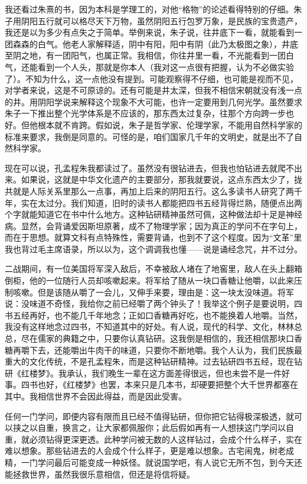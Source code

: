 我还看过朱熹的书，因为本科是学理工的，对他“格物”的论述看得特别的仔细。朱子用阴阳五行就可以格尽天下万物，虽然阴阳五行包罗万象，是民族的宝贵遗产，我还是以为多少有点失之于简单。举例来说，朱子说，往井底下一看，就能看到一团森森的白气。他老人家解释适，阴中有阳，阳中有阴（此乃太极图之象），井底至阴之地，有一团阳气，也属正常。我相信，你往井里一看，不光能看到一团白气，还能看到一个人头，那就是你本人（我对这一点很有把握，认为不必做实验了）。不知为什么，这一点他没有提到。可能观察得不仔细，也可能是视而不见，对学者来说，这是不可原谅的。还有可能是井太深，但我不相信宋朝就没有浅一点的井。用阴阳学说来解释这个现象不大可能，也许一定要用到几何光学。虽然要求朱子一下推出整个光学体系是不应该的，那东西太过复杂，往那个方向跨一步也好。但他根本就不肯跨。假如说，朱子是哲学家、伦理学家，不能用自然科学家的标准来要求，我倒是同意的。可怪的是，咱们国家几千年的文明史，就是出不了自然科学家。 

现在可以说，孔孟程朱我都读过了。虽然没有很钻进去，但我也怕钻进去就爬不出来。如果说，这就是中华文化遗产的主要部分，那我就要说，这点东西太少了，拢共就是人际关系里那么一点事，再加上后来的阴阳五行。这么多读书人研究了两千年，实在太过分。我们知道，旧时的读书人都能把四书五经背得烂熟，随便点出两个字就能知道它在书中什么地方。这种钻研精神虽然可佩，这种做法却十足是神经病。显然，会背诵爱因斯坦原著，成不了物理学家；因为真正的学问不在字句上，而在于思想。就算文科有点特殊性，需要背诵，也到不了这个程度。因为“文革”里我也背过毛主席语录，所以以为，这个调调我也懂——说是诵经念咒，并不过分。 

二战期间，有一位美国将军深入敌后，不幸被敌人堵在了地窖里，敌人在头上翻箱倒柜，他的一位随行人员却咳嗽起来。将军给了随从一块口香糖让他嚼，以此来压制咳嗽。但是该随从嚼了一会儿，又伸手来要，理由是：这一块太没味道。将军说：没味道不奇怪，我给你之前已经嚼了两个钟头了！我举这个例子是要说明，四书五经再好，也不能几千年地念；正如口香糖再好吃，也不能换着人地嚼。当然，我没有这样地念过四书，不知道其中的好处。有人说，现代的科学、文化，林林总总，尽在儒家的典籍之中，只要你认真钻研。这我倒是相信的，我还相信那块口香糖再嚼下去，还能嚼出牛肉干的味道，只要你不断地嚼。我个人认为，我们民族最重大的文化传统，不是孔孟程朱，而是这种钻研精神。过去钻研四书五经，现在钻研《红楼梦》。我承认，我们晚生一辈在这方面差得很远，但也未尝不是一件好事。四书也好，《红楼梦》也罢，本来只是几本书，却硬要把整个大千世界都塞在其中。我相信世界不会因此得益，而是因此受害。 

任何一门学问，即便内容有限而且已经不值得钻研，但你把它钻得极深极透，就可以挟之以自重，换言之，让大家都佩服你；此后假如再有一人想挟这门学问以自重，就必须钻得更深更透。此种学问被无数的人这样钻过，会成个什么样子，实在难以想象。那些钻进去的人会成个什么样子，更是难以想象。古宅闹鬼，树老成精，一门学问最后可能变成一种妖怪。就说国学吧，有人说它无所不包，到今天还能拯救世界，虽然我很乐意相信，但还是将信将疑。

